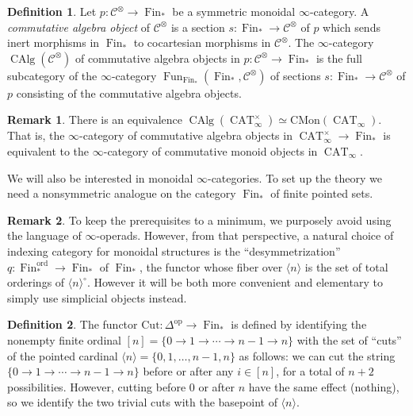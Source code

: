\documentclass{article}
\theoremstyle{definition}
\newtheorem{definition}{Definition}[subsection]
\newtheorem{remark}{Remark}[subsection]
\newcommand{\C}{\mathcal{C}}
\renewcommand{\i}{\infty}
\newcommand{\op}{\mathrm{op}}
\newcommand{\n}{\langle n\rangle}
\DeclareMathOperator{\CAlg}{CAlg}
\DeclareMathOperator{\CAT}{CAT}
\DeclareMathOperator{\Fin}{Fin}
\DeclareMathOperator{\Fun}{Fun}
\newcommand{\CMon}{\mathrm{CMon}}
\begin{document}
\begin{definition}
Let $p:\C^\otimes\to\Fin_*$ be a symmetric monoidal $\infty$-category.
A {\em commutative algebra object}
of $\C^\otimes$ is a section $s:\Fin_*\to\C^\otimes$ of $p$ which sends inert morphisms in $\Fin_*$ to cocartesian morphisms in $\C^\otimes$.
The $\infty$-category $\CAlg(\C^\otimes)$ of commutative algebra objects in $p:\C^\otimes\to\Fin_*$ is the full subcategory of the $\infty$-category $\Fun_{\Fin_*}(\Fin_*,\C^\otimes)$ of sections $s:\Fin_*\to\C^\otimes$ of $p$ consisting of the commutative algebra objects.
\end{definition}

\begin{remark}
There is an equivalence $\CAlg(\CAT_\i^\times)\simeq\CMon(\CAT_\i)$.
That is, the $\i$-category of commutative algebra objects in $\CAT_\i^\times\to\Fin_*$ is equivalent to the $\i$-category of commutative monoid objects in $\CAT_\i$.
\end{remark}

We will also be interested in monoidal $\infty$-categories.
To set up the theory we need a nonsymmetric analogue on the category $\Fin_*$ of finite pointed sets.
\begin{remark}
To keep the prerequisites to a minimum, we purposely avoid using the language of $\i$-operads.
However, from that perspective, a natural choice of indexing category for monoidal structures is the ``desymmetrization'' $q:\Fin_*^\mathrm{ord}\to\Fin_*$ of $\Fin_*$, the functor whose fiber over $\n$ is the set of total orderings of $\n^\circ$.
However it will be both more convenient and elementary to simply use simplicial objects instead.
\end{remark}
\begin{definition}
The functor $\mathrm{Cut}:\Delta^{\op}\to\Fin_*$ is defined by identifying the nonempty finite ordinal $[n]=\{0\to 1\to\cdots\to n-1\to n\}$ with the set of ``cuts'' of the pointed cardinal $\n=\{0,1,\ldots,n-1,n\}$ as follows: we can cut the string $\{0\to 1\to\cdots\to n-1\to n\}$ before or after any $i\in [n]$, for a total of $n+2$ possibilities.
However, cutting before $0$ or after $n$ have the same effect (nothing), so we identify the two trivial cuts with the basepoint of $\n$.
\end{definition}
\end{document}
